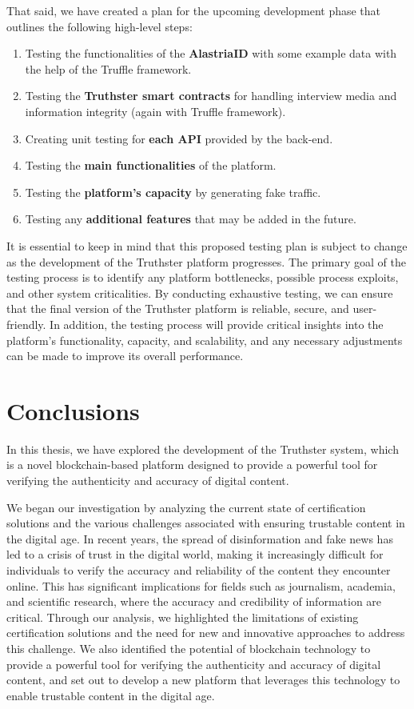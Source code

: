 \documentclass[target=mst,aauheader=]{thud}
\begin{document}
That said, we have created a plan for the upcoming development phase that outlines the following high-level steps:
\begin{enumerate}

    \item Testing the functionalities of the \textbf{AlastriaID} with some example data with the help of the Truffle framework.
    \item Testing the \textbf{Truthster smart contracts} for handling interview media and information integrity (again with Truffle framework).
    \item Creating unit testing for \textbf{each API} provided by the back-end.
    \item Testing the \textbf{main functionalities} of the platform.
    \item Testing the \textbf{platform's capacity} by generating fake traffic.
    \item Testing any \textbf{additional features} that may be added in the future.

\end{enumerate}

It is essential to keep in mind that this proposed testing plan is subject to change as the development of the Truthster platform progresses. The primary goal of the testing process is to identify any platform bottlenecks, possible process exploits, and other system criticalities. By conducting exhaustive testing, we can ensure that the final version of the Truthster platform is reliable, secure, and user-friendly. In addition, the testing process will provide critical insights into the platform's functionality, capacity, and scalability, and any necessary adjustments can be made to improve its overall performance.

\chapter{Conclusions}
\label{chapter:conclusions}

In this thesis, we have explored the development of the Truthster system, which is a novel blockchain-based platform designed to provide a powerful tool for verifying the authenticity and accuracy of digital content.

We began our investigation by analyzing the current state of certification solutions and the various challenges associated with ensuring trustable content in the digital age. In recent years, the spread of disinformation and fake news has led to a crisis of trust in the digital world, making it increasingly difficult for individuals to verify the accuracy and reliability of the content they encounter online. This has significant implications for fields such as journalism, academia, and scientific research, where the accuracy and credibility of information are critical. Through our analysis, we highlighted the limitations of existing certification solutions and the need for new and innovative approaches to address this challenge. We also identified the potential of blockchain technology to provide a powerful tool for verifying the authenticity and accuracy of digital content, and set out to develop a new platform that leverages this technology to enable trustable content in the digital age.
\end{document}
